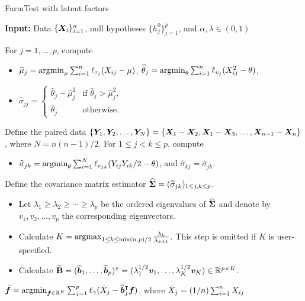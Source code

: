 \begin{algorithm}[!t]
\caption{FarmTest with latent factors \citep{FKSZ2017}} \label{alg2}
\hspace*{\algorithmicindent} \hspace{-0.6cm} \textbf{Input:} Data $\{\bm{X}_i\}_{i=1}^n$, null hypotheses $\{h^0_j\}_{j=1}^p$, and $\alpha, \lambda\in (0,1)$
\begin{algorithmic}[1]
\STATE For $j = 1, \ldots, p$, compute
\begin{itemize}
\item $\widehat{\mu}_j  =  \mathop{\mathrm{argmin}}_{ \mu  } \sum_{i=1}^n \ell_{\tau_j}( X_{ij}    -    \mu  ) $,  $\widehat{\theta}_j  =  \mathop{\mathrm{argmin}}_{ \theta  } \sum_{i=1}^n \ell_{\upsilon_j }( X^2_{ij}    -    \theta  ) $,
\item $\hat{\sigma}_{jj} =
  \begin{cases} \hat{\theta}_j-\hat{\mu}^2_j & \text{if }  \hat{\theta}_j >  \hat{\mu}^2_j, \\
   \hat{\theta}_j        & \text{otherwise}.
   \end{cases}$
 \end{itemize}
\STATE Define the paired data $\{ \bm{Y}_{1}, \bm{Y}_{2}, \ldots, \bm{Y}_{N} \}  = \{ \bm{X}_{1} - \bm{X}_{2}, \bm{X}_{1} - \bm{X}_{3}, \ldots, \bm{X}_{n-1} - \bm{X}_{n} \}$, where $N= n(n-1)/2$. For $1\leq j <  k\leq p$, compute
\begin{itemize}
\item $\widehat{\sigma}_{jk}=  \mathop{\mathrm{argmin}}_{ \theta  } \sum_{i=1}^N \ell_{\upsilon_{jk}}( Y_{ij} Y_{ik} / 2  -    \theta  ) $, and $\hat \sigma_{kj} =\hat \sigma_{jk}$.
\end{itemize}
\STATE Define the covariance matrix estimator $\widehat{\bm{\Sigma}}= ( \widehat{\sigma}_{jk})_{1\leq j, k\leq p}$.
\begin{itemize}
\item Let $\lambda_1 \geq \lambda_2 \geq \cdots \geq  \lambda_p$ be the ordered eigenvalues of $\widehat{\bm{\Sigma}}$ and denote by $v_1, v_2,  \ldots, v_p$ the corresponding eigenvectors.
\item Calculate $K=\mathop{\mathrm{argmax}}_{1\leq k\leq \min(n,p)/2} \frac{\lambda_{k}}{\lambda_{k+1} }$. This step is omitted if $K$ is user-specified.
\item Calculate $\widehat{\mathbf{B}}  = (\widehat{\bm{b}}_1, \ldots, \widehat{\bm{b}}_p)^\intercal = (\lambda_1^{1/2}\bm{v}_1, \ldots, \lambda^{1/2}_K\bm{v}_K) \in \mathbb{R}^{p\times K}$.
\end{itemize}
\STATE $\bar{\bm f}=\mathop{\mathrm{argmin}}_{ \bm f \in \mathbb{R}^K } \sum_{j=1} ^p\ell_{\gamma}( \bar X_{j}    -    \widehat{\bm{b}}_j^\intercal{\bm f}  ) $, where $ \bar X_{j}    = (1/n)\sum_{i=1}^n X_{ij}$.

\end{algorithmic}
\end{algorithm}
